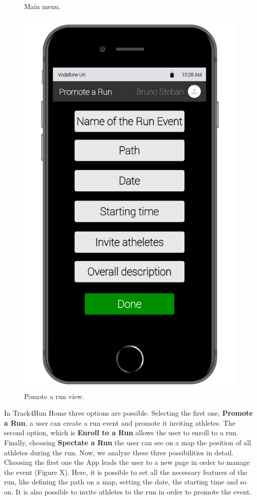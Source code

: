 \begin{enumerate}
\begin{figure}[H]
\begin{center}
\begin{minipage}[c]{.40\textwidth}
	\caption{Main menu.}
        \end{minipage}%
        \hspace{10mm}%
        \begin{minipage}[c]{.40\textwidth}
        \centering
          \includegraphics[height=14 cm]{Images/Mockups/Track4RunMockup6.jpg}
	\caption{Pomote a run view.}
        \end{minipage}
      \end{center}
\end{figure}
In Track4Run Home three options are possible. Selecting the first one, \textbf{Promote a Run}, a user can create a run event and promote it inviting athletes. The second option, which is \textbf{Enroll to a Run} allows the user to enroll to a run. Finally, choosing \textbf{Spectate a Run} the user can see on a map the position of all athletes during the run. Now, we analyze these three possibilities in detail. Choosing the first one the App leads the user to a new page in order to manage the event (Figure X). Here, it is possible to set all the necessary features of the run, like defining the path on a map, setting the date, the starting time and so on. It is also possible to invite athletes to the run in order to promote the event.
\clearpage
\begin{figure}[H]

\end{figure}
\end{enumerate}
